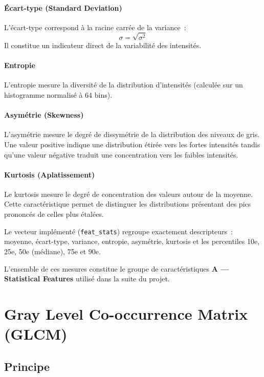 \paragraph{Écart-type (Standard Deviation)}
L'écart-type correspond à la racine carrée de la variance~:
\begin{equation}
  \sigma=\sqrt{\sigma^2}
\end{equation}
Il constitue un indicateur direct de la variabilité des intensités.

\paragraph{Entropie}
L'entropie mesure la diversité de la distribution d'intensités (calculée sur un histogramme
normalisé à 64 bins).

\paragraph{Asymétrie (Skewness)}
L'asymétrie mesure le degré de dissymétrie de la distribution des niveaux de gris. Une valeur
positive indique une distribution étirée vers les fortes intensités tandis qu'une valeur
négative traduit une concentration vers les faibles intensités.

\paragraph{Kurtosis (Aplatissement)}
Le kurtosis mesure le degré de concentration des valeurs autour de la moyenne. Cette
caractéristique permet de distinguer les distributions présentant des pics prononcés de celles
plus étalées.

Le vecteur implémenté (\texttt{feat\_stats}) regroupe exactement \dimStats{} descripteurs~:
moyenne, écart-type, variance, entropie, asymétrie, kurtosis et les percentiles
10e, 25e, 50e (médiane), 75e et 90e.

L'ensemble de ces mesures constitue le groupe de caractéristiques \textbf{A --- Statistical
Features} utilisé dans la suite du projet.

\section{Gray Level Co-occurrence Matrix (GLCM)}

\subsection{Principe}

